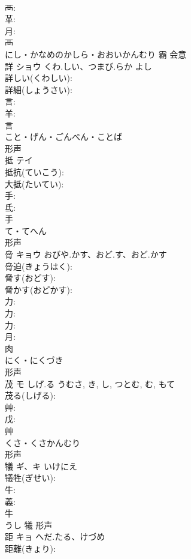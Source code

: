 \documentclass[8pt]{extreport}
\begin{document}
\begin{CJK}{UTF8}{min}
\\	襾: 
\\	革: 
\\	月: 
\\	襾	
\\	にし・かなめのかしら・おおいかんむり	霸	会意 
\\	詳	ショウ	くわ.しい、つまび.らか	よし	
\\	詳しい(くわしい): 
\\	詳細(しょうさい): 
\\	言: 
\\	羊: 
\\	言	
\\	こと・げん・ごんべん・ことば	
\\	形声 
\\	抵	テイ			
\\	抵抗(ていこう): 
\\	大抵(たいてい): 
\\	手: 
\\	氐: 
\\	手	
\\	て・てへん	
\\	形声 
\\	脅	キョウ	おびや.かす、おど.す、おど.かす		
\\	脅迫(きょうはく): 
\\	脅す(おどす): 
\\	脅かす(おどかす): 
\\	力: 
\\	力: 
\\	力: 
\\	月: 
\\	肉	
\\	にく・にくづき	
\\	形声 
\\	茂	モ	しげ.る	うむさ, き, し, つとむ, む, もて	
\\	茂る(しげる): 
\\	艸: 
\\	戊: 
\\	艸	
\\	くさ・くさかんむり	
\\	形声 
\\	犠	ギ、キ	いけにえ		
\\	犠牲(ぎせい): 
\\	牛: 
\\	義: 
\\	牛	
\\	うし	犧	形声 
\\	距	キョ	へだ.たる、けづめ		
\\	距離(きょり): 

\end{CJK}
\end{document}
